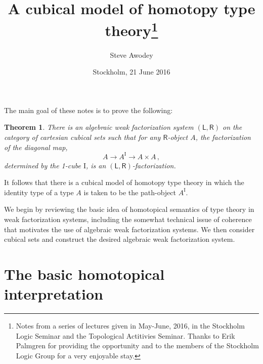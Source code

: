 \documentclass[12pt]{article}
\newcommand{\I}{\ensuremath{\mathrm{I}}}
\newtheorem*{theorem*}{Theorem}
\theoremstyle{remark}
\theoremstyle{definition}
\begin{document}

\title{A cubical model of homotopy type theory\thanks{
Notes from a series of lectures given in May-June, 2016, in the Stockholm Logic Seminar and the Topological Actitivies Seminar.  Thanks to Erik Palmgren for providing the opportunity and  to the members of the Stockholm Logic Group for a very enjoyable stay.}
}
\author{Steve Awodey
}
\date{Stockholm, 21 June 2016}

\maketitle
\noindent
The main goal of these notes is to prove the following:

\begin{theorem*}
There is an algebraic weak factorization system $(\mathsf{L}, \mathsf{R})$ on the category of cartesian cubical sets such that for any $\mathsf{R}$-object $A$, the factorization of the diagonal map,
\[
A \to A^\I \to A\times  A\,,
\]
determined by the 1-cube $\I$, is an $(\mathsf{L}, \mathsf{R})$-factorization.
\end{theorem*}

\noindent It follows that there is a cubical model of homotopy type theory in which the identity type of a type $A$ is taken to be the path-object $A^\I$.

We begin by reviewing the basic idea of homotopical semantics of type theory in weak factorization systems, including the somewhat technical issue of coherence that motivates the use of algebraic weak factorization systems. We then consider cubical sets and construct the desired algebraic weak factorization system.

\section{The basic homotopical interpretation}
\end{document}
